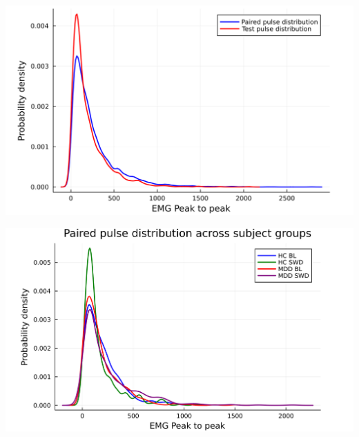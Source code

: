\documentclass{article}
\begin{document}
~

\includegraphics[scale=0.14]{Paired-TestDist}
\raggedright
\includegraphics[scale=0.14]{P-dist-subjects-big}
\end{document}
